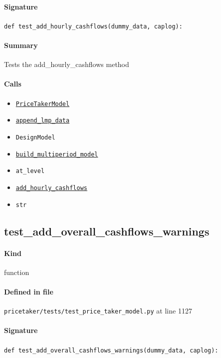 \documentclass[11pt]{report}
\begin{document}
\paragraph{Signature} \texttt{def test\_add\_hourly\_cashflows(dummy\_data, caplog):}
\paragraph{Summary} Tests the add\_hourly\_cashflows method
\paragraph{Calls}
\begin{itemize}[leftmargin=*]
  \item \hyperref[def:pricetaker-price_taker_model.py:PriceTakerModel:L161]{\texttt{PriceTakerModel}}
  \item \hyperref[def:pricetaker-price_taker_model.py:PriceTakerModel.append_lmp_data:L221]{\texttt{append\_lmp\_data}}
  \item \texttt{DesignModel}
  \item \hyperref[def:pricetaker-price_taker_model.py:PriceTakerModel.build_multiperiod_model:L291]{\texttt{build\_multiperiod\_model}}
  \item \texttt{at\_level}
  \item \hyperref[def:pricetaker-price_taker_model.py:PriceTakerModel.add_hourly_cashflows:L897]{\texttt{add\_hourly\_cashflows}}
  \item \texttt{str}
\end{itemize}
\subsection{test\_add\_overall\_cashflows\_warnings}
\label{def:pricetaker-tests-test_price_taker_model.py:test_add_overall_cashflows_warnings:L1127}
\paragraph{Kind} function
\paragraph{Defined in file} \texttt{pricetaker/tests/test\_price\_taker\_model.py} at line 1127
\paragraph{Signature} \texttt{def test\_add\_overall\_cashflows\_warnings(dummy\_data, caplog):}
\end{document}
